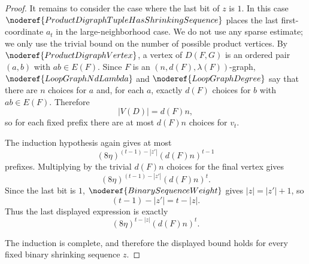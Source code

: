 \begin{proof}
It remains to consider the case where the last bit of \(z\) is \(1\). In this case \(\noderef{ProductDigraphTupleHasShrinkingSequence}\) places the last first-coordinate \(a_t\) in the large-neighborhood case. We do not use any sparse estimate; we only use the trivial bound on the number of possible product vertices. By \(\noderef{ProductDigraphVertex}\), a vertex of \(D(F,G)\) is an ordered pair \((a,b)\) with \(ab\in E(F)\). Since \(F\) is an \((n,d(F),\lambda(F))\)-graph, \(\noderef{LoopGraphNdLambda}\) and \(\noderef{LoopGraphDegree}\) say that there are \(n\) choices for \(a\) and, for each \(a\), exactly \(d(F)\) choices for \(b\) with \(ab\in E(F)\). Therefore
\[
  |V(D)|=d(F)n,
\]
so for each fixed prefix there are at most \(d(F)n\) choices for \(v_t\).

The induction hypothesis again gives at most
\[
  (8\eta)^{(t-1)-|z'|}(d(F)n)^{t-1}
\]
prefixes. Multiplying by the trivial \(d(F)n\) choices for the final vertex gives
\[
  (8\eta)^{(t-1)-|z'|}(d(F)n)^t.
\]
Since the last bit is \(1\), \(\noderef{BinarySequenceWeight}\) gives \(|z|=|z'|+1\), so
\[
  (t-1)-|z'|=t-|z|.
\]
Thus the last displayed expression is exactly
\[
  (8\eta)^{t-|z|}(d(F)n)^t.
\]

The induction is complete, and therefore the displayed bound holds for every fixed binary shrinking sequence \(z\).
\end{proof}
